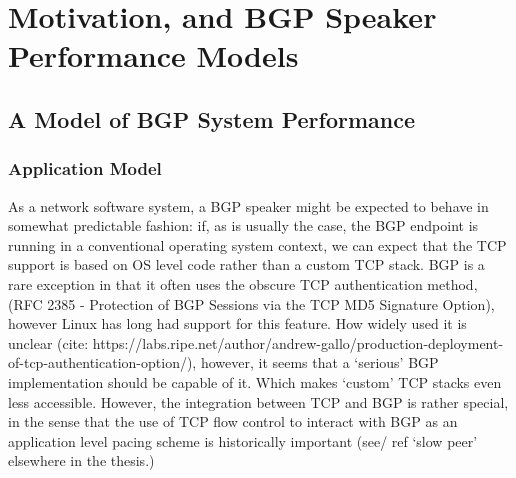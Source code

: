 

\section{Motivation, and BGP Speaker Performance Models}

\subsection{A Model of BGP System Performance}

\subsubsection*{Application Model}
As a network software system, a BGP speaker might be expected to behave in somewhat predictable fashion: if, as is usually the case, the BGP endpoint is running in a conventional operating system context, we can expect that the TCP support is based on OS level code rather than a custom TCP stack.
BGP is a rare exception in that it often uses the obscure TCP authentication method, (RFC 2385 - Protection of BGP Sessions via the TCP MD5 Signature Option), however Linux has long had support for this feature.
How widely used it is unclear (cite: https://labs.ripe.net/author/andrew-gallo/production-deployment-of-tcp-authentication-option/), however, it seems that a `serious' BGP implementation should be capable of it.
Which makes `custom' TCP stacks even less accessible.
However, the integration between TCP and BGP is rather special, in the sense that the use of TCP flow control to interact with BGP as an application level pacing scheme is historically important (see/ ref `slow peer' elsewhere in the thesis.)

